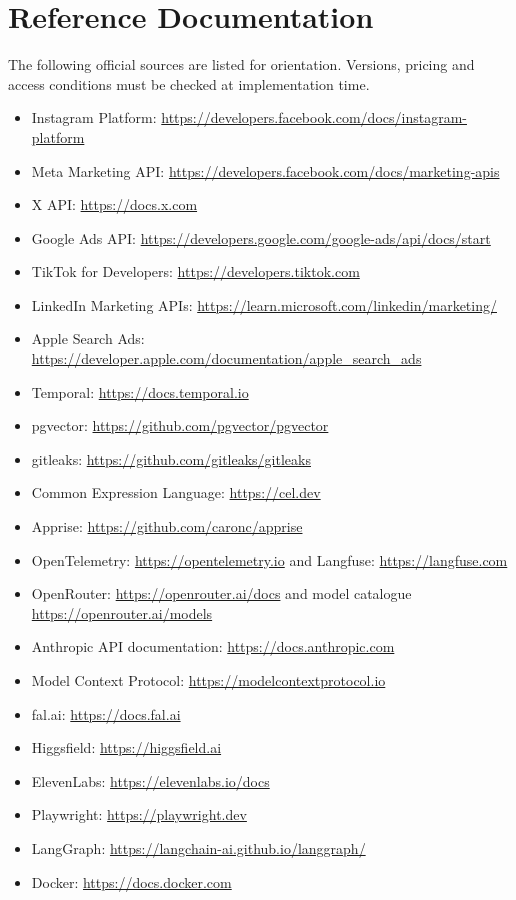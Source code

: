 \documentclass[11pt,a4paper]{article}
\begin{document}
\section*{Reference Documentation}
The following official sources are listed for orientation. Versions, pricing and access conditions must be checked at implementation time.

\begin{itemize}[leftmargin=1.2em]
  \item Instagram Platform: \url{https://developers.facebook.com/docs/instagram-platform}
  \item Meta Marketing API: \url{https://developers.facebook.com/docs/marketing-apis}
  \item X API: \url{https://docs.x.com}
  \item Google Ads API: \url{https://developers.google.com/google-ads/api/docs/start}
  \item TikTok for Developers: \url{https://developers.tiktok.com}
  \item LinkedIn Marketing APIs: \url{https://learn.microsoft.com/linkedin/marketing/}
  \item Apple Search Ads: \url{https://developer.apple.com/documentation/apple_search_ads}
  \item Temporal: \url{https://docs.temporal.io}
  \item pgvector: \url{https://github.com/pgvector/pgvector}
  \item gitleaks: \url{https://github.com/gitleaks/gitleaks}
  \item Common Expression Language: \url{https://cel.dev}
  \item Apprise: \url{https://github.com/caronc/apprise}
  \item OpenTelemetry: \url{https://opentelemetry.io} and Langfuse: \url{https://langfuse.com}
  \item OpenRouter: \url{https://openrouter.ai/docs} and model catalogue \url{https://openrouter.ai/models}
  \item Anthropic API documentation: \url{https://docs.anthropic.com}
  \item Model Context Protocol: \url{https://modelcontextprotocol.io}
  \item fal.ai: \url{https://docs.fal.ai}
  \item Higgsfield: \url{https://higgsfield.ai}
  \item ElevenLabs: \url{https://elevenlabs.io/docs}
  \item Playwright: \url{https://playwright.dev}
  \item LangGraph: \url{https://langchain-ai.github.io/langgraph/}
  \item Docker: \url{https://docs.docker.com}
\end{itemize}
\end{document}
